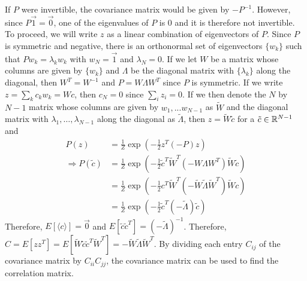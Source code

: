 \documentclass{article}
\begin{document}
If $P$ were invertible, the covariance matrix would be given by $-P^{-1}$. However, since $P\vec{1}=\vec{0}$, one of the eigenvalues of $P$ is $0$ and it is therefore not invertible.
To proceed, we will write $z$ as a linear combination of eigenvectors of $P$. Since $P$ is symmetric and negative, there is an orthonormal set of eigenvectors $\{w_k\}$ such that $Pw_k=\lambda_kw_k$ with $w_N=\vec{1}$ and $\lambda_N=0$. If we let $W$ be a matrix whose columns are given by $\{w_k\}$ and $\Lambda$ be the diagonal matrix with $\{\lambda_k\}$ along the diagonal, then $W^T=W^{-1}$ and $P=W\Lambda W^T$ since $P$ is symmetric. If we write $z=\sum_kc_kw_k=W{c}$, then $c_N=0$ since $\sum_iz_i=0$. If we then denote the $N$ by $N-1$ matrix whose columns are given by $w_1,...w_{N-1}$ as $\tilde{W}$ and the diagonal matrix with $\lambda_1,\dots,\lambda_{N-1}$ along the diagonal as $\tilde{\Lambda}$, then $z=\tilde{W}\tilde{c}$ for a $\tilde{c}\in{\mathbb{R}}^{N-1}$ and
\begin{align*}
P(z)&=\frac{1}{Z}\exp\left(-\frac{1}{2}z^T(-{P})z\right)
\\\Rightarrow P(\tilde{c})&=\frac{1}{Z}\exp\left(-\frac{1}{2}\tilde{c}^T\tilde{W}^T(-W\Lambda W^T)\tilde{W}\tilde{c}\right)
\\&=\frac{1}{Z}\exp\left(-\frac{1}{2}c^T\tilde{W}^T(-\tilde{W}\tilde{\Lambda}\tilde{W}^T)\tilde{W}c\right) 
\\&=\frac{1}{Z}\exp\left(-\frac{1}{2}\tilde{c}^T(-\tilde{\Lambda})\tilde{c}\right)  
\end{align*}
Therefore, $E[\langle c \rangle ]=\vec{0}$ and $E[\tilde{c}\tilde{c}^T]=(-\tilde{\Lambda})^{-1}$. Therefore, $C=E[zz^T]=E[\tilde{W}\tilde{c}\tilde{c}^T\tilde{W}^T]=-\tilde{W}\tilde{\Lambda}\tilde{W}^T$.  By dividing each entry $C_{ij}$ of the covariance matrix by $C_{ii}C_{jj}$, the covariance matrix can be used to find the correlation matrix.
\end{document}
